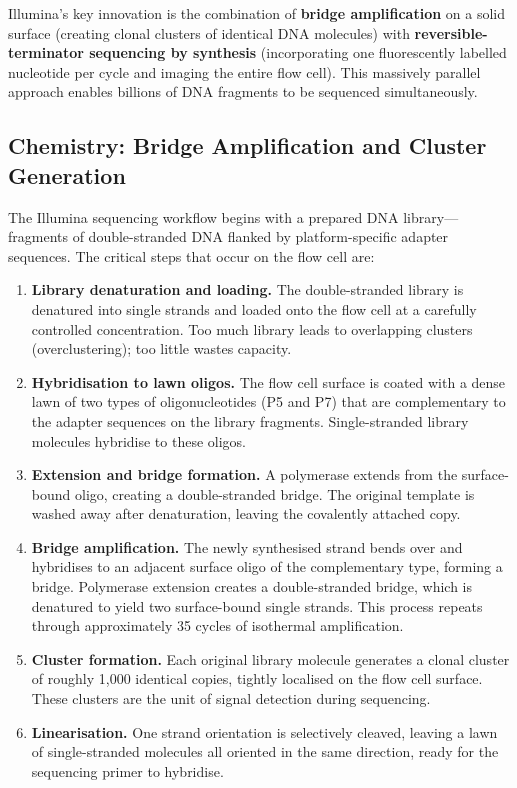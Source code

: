 \begin{keyconcept}[title={Illumina's Core Innovation}]
Illumina's key innovation is the combination of \textbf{bridge amplification} on a solid surface (creating clonal clusters of identical DNA molecules) with \textbf{reversible-terminator sequencing by synthesis} (incorporating one fluorescently labelled nucleotide per cycle and imaging the entire flow cell). This massively parallel approach enables billions of DNA fragments to be sequenced simultaneously.
\end{keyconcept}

\subsection{Chemistry: Bridge Amplification and Cluster Generation}

The Illumina sequencing workflow begins with a prepared DNA library---fragments of double-stranded DNA flanked by platform-specific adapter sequences. The critical steps that occur on the flow cell are:

\begin{enumerate}[label=\textbf{Step \arabic*:}, leftmargin=2.5cm]
  \item \textbf{Library denaturation and loading.} The double-stranded library is denatured into single strands and loaded onto the flow cell at a carefully controlled concentration. Too much library leads to overlapping clusters (overclustering); too little wastes capacity.

  \item \textbf{Hybridisation to lawn oligos.} The flow cell surface is coated with a dense lawn of two types of oligonucleotides (P5 and P7) that are complementary to the adapter sequences on the library fragments. Single-stranded library molecules hybridise to these oligos.

  \item \textbf{Extension and bridge formation.} A polymerase extends from the surface-bound oligo, creating a double-stranded bridge. The original template is washed away after denaturation, leaving the covalently attached copy.

  \item \textbf{Bridge amplification.} The newly synthesised strand bends over and hybridises to an adjacent surface oligo of the complementary type, forming a bridge. Polymerase extension creates a double-stranded bridge, which is denatured to yield two surface-bound single strands. This process repeats through approximately 35 cycles of isothermal amplification.

  \item \textbf{Cluster formation.} Each original library molecule generates a clonal cluster of roughly 1{,}000 identical copies, tightly localised on the flow cell surface. These clusters are the unit of signal detection during sequencing.

  \item \textbf{Linearisation.} One strand orientation is selectively cleaved, leaving a lawn of single-stranded molecules all oriented in the same direction, ready for the sequencing primer to hybridise.
\end{enumerate}

